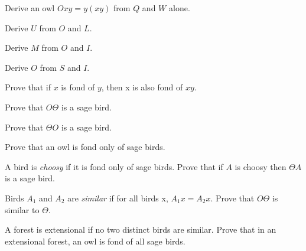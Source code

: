 \documentclass[12pt, letterpaper]{article}
\begin{document}
\begin{prob}{13.13}  
Derive an owl $Oxy = y(xy)$ from $Q$ and $W$ alone.
\end{prob}

\begin{prob}{13.14}  
Derive $U$ from $O$ and $L$.
\end{prob}

\begin{prob}{13.15}  
Derive $M$ from $O$ and $I$.
\end{prob}

\begin{prob}{13.16}  
Derive $O$ from $S$ and $I$.
\end{prob}

\begin{prob}{13.17}  
Prove that if $x$ is fond of $y$, then x is also fond of $xy$.
\end{prob}

\begin{prob}{13.18}  
Prove that $O\Theta$ is a sage bird.
\end{prob}

\begin{prob}{13.19}  
Prove that $\Theta O$ is a sage bird.
\end{prob}

\begin{prob}{13.20}  
Prove that an owl is fond only of sage birds.
\end{prob}

\begin{prob}{13.21}  
A bird is \emph{choosy} if it is fond only of sage birds. Prove that if $A$ is choosy then $\Theta A$ is a sage bird.
\end{prob}

\begin{prob}{13.22}  
Birds $A_1$ and $A_2$ are \emph{similar} if for all birds x, $A_1x = A_2x$. Prove that $O\Theta$ is similar to $\Theta$.
\end{prob}

\begin{prob}{13.23}  
A forest is extensional if no two distinct birds are similar. Prove that in an extensional forest, an owl is fond of all sage birds.
\end{prob}
\end{document}
